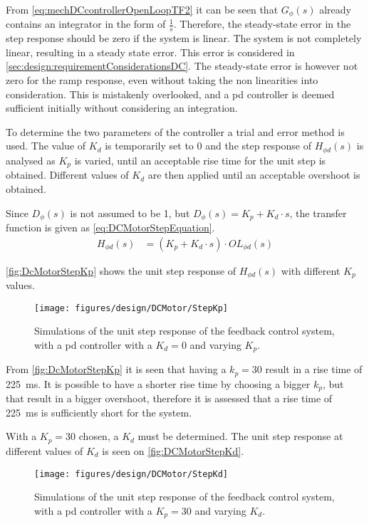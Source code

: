 From \autoref{eq:mechDCcontrollerOpenLoopTF2} it can be seen that $G_\phi (s)$ already contains an integrator in the form of $\frac{1}{s}$. Therefore, the steady-state error in the step response should be zero if the system is linear. The system is not completely linear, resulting in a steady state error. This error is considered in \autoref{sec:design:requirementConsiderationsDC}. The steady-state error is however not zero for the ramp response, even without taking the non linearities into consideration. This is mistakenly overlooked, and a \gls{pd} controller is deemed sufficient initially without considering an integration.

To determine the two parameters of the controller a trial and error method is used. The value of $K_d$ is temporarily set to 0 and the step response of $H_{\phi d}(s)$ is analysed as $K_p$ is varied, until an acceptable rise time for the unit step is obtained. Different values of $K_d$ are then applied until an acceptable overshoot is obtained.

Since $D_\phi (s)$ is not assumed to be 1, but $D_\phi (s) = K_p + K_d\cdot s$, the transfer function is given as \autoref{eq:DCMotorStepEquation}. 
\begin{align} 
H_{\phi d}(s) &= (K_p + K_d \cdot s ) \cdot OL_{\phi d}(s) \label{eq:DCMotorStepEquation} 
\end{align}

\autoref{fig:DcMotorStepKp} shows the unit step response of $H_{\phi d}(s)$ with different $K_p$ values.

\begin{figure}[h!]
    \centering
        \texttt{[image: figures/design/DCMotor/StepKp]}
        \caption{Simulations of the unit step response of the feedback control system, with a \gls{pd} controller with a $K_d = 0$ and varying $K_p$.}
        \label{fig:DcMotorStepKp}
\end{figure}

From \autoref{fig:DcMotorStepKp} it is seen that having a $k_p = 30$ result in a rise time of \SI{225}{\milli\second}. It is possible to have a shorter rise time by choosing a bigger $k_p$, but that result in a bigger overshoot, therefore it is assessed that a rise time of \SI{225}{\milli\second} is sufficiently short for the system. 

With a $K_p = 30$ chosen, a $K_d$ must be determined. The unit step response at different values of $K_d$ is seen on \autoref{fig:DCMotorStepKd}. 
\begin{figure}[h!]
    \centering
        \texttt{[image: figures/design/DCMotor/StepKd]}
        \caption{Simulations of the unit step response of the feedback control system, with a \gls{pd} controller with a $K_p = 30$ and varying $K_d$.}
        \label{fig:DCMotorStepKd}
\end{figure}

